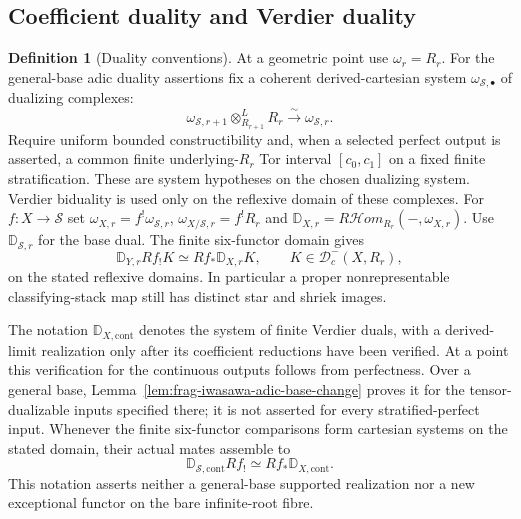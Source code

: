 \documentclass[11pt]{article}
\theoremstyle{definition}
\newtheorem{definition}[theorem]{Definition}
\theoremstyle{remark}
\begin{document}
\subsection{Coefficient duality and Verdier duality}

\begin{definition}[Duality conventions]
\label{def:frag-continuous-duality}
At a geometric point use $\omega_r=R_r$.  For the general-base
adic duality assertions fix a coherent derived-cartesian system
$\omega_{\mathscr S,\bullet}$ of dualizing complexes:
\[
 \omega_{\mathscr S,r+1}\otimes^L_{R_{r+1}}R_r
       \xrightarrow{\sim}\omega_{\mathscr S,r}.
\]
Require uniform bounded constructibility and, when a selected perfect
output is asserted, a common finite underlying-$R_r$ Tor interval
$[c_0,c_1]$ on a fixed finite stratification.  These are system
hypotheses on the chosen dualizing system.
Verdier biduality is used only on the reflexive domain of these
complexes.  For
$f:X\to\mathscr S$ set $\omega_{X,r}=f^!\omega_{\mathscr S,r}$,
$\omega_{X/\mathscr S,r}=f^!R_r$ and
$\mathbb D_{X,r}=R\mathcal Hom_{R_r}(-,\omega_{X,r})$.
Use $\mathbb D_{\mathscr S,r}$ for the base dual.
The finite six-functor domain gives
\begin{equation}
 \mathbb D_{Y,r}Rf_!K\simeq Rf_*\mathbb D_{X,r}K,
 \qquad K\in\mathcal D^-_c(X,R_r),
 \label{eq:frag-unbounded-finite-verdier}
\end{equation}
on the stated reflexive domains.  In particular a proper
nonrepresentable classifying-stack map still has distinct star and
shriek images.

The notation $\mathbb D_{X,\mathrm{cont}}$ denotes the system of
finite Verdier duals, with a derived-limit realization only after
its coefficient reductions have been verified.  At a point this
verification for the continuous outputs follows from perfectness.
Over a general base, Lemma~\ref{lem:frag-iwasawa-adic-base-change}
proves it for the tensor-dualizable inputs specified there; it is
not asserted for every stratified-perfect input.
Whenever the finite six-functor comparisons form cartesian systems
on the stated domain, their actual mates assemble to
\begin{equation}
 \mathbb D_{\mathscr S,\mathrm{cont}}Rf_!
 \simeq Rf_*\mathbb D_{X,\mathrm{cont}}.
 \label{eq:frag-relative-verdier-mate}
\end{equation}
This notation asserts neither a general-base supported realization
nor a new exceptional functor on the bare infinite-root fibre.


\end{definition}
\end{document}
